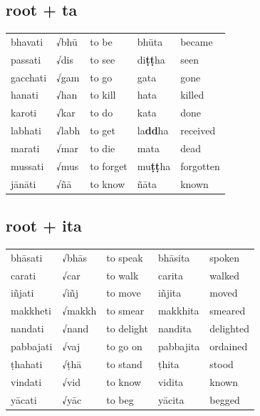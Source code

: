 \documentclass[11pt,oneside]{memoir}
\begin{document}
\subsection{root + ta}
\label{sec:org4da6b1a}

\begin{center}
\begin{tabular}{lllll}
bhavati & √bhū & to be & bhūta & became\\[0pt]
passati & √dis & to see & di\textbf{ṭṭ}ha & seen\\[0pt]
gacchati & √gam & to go & gata & gone\\[0pt]
hanati & √han & to kill & hata & killed\\[0pt]
karoti & √kar & to do & kata & done\\[0pt]
labhati & √labh & to get & la\textbf{dd}ha & received\\[0pt]
marati & √mar & to die & mata & dead\\[0pt]
mussati & √mus & to forget & mu\textbf{ṭṭ}ha & forgotten\\[0pt]
jānāti & √ñā & to know & ñāta & known\\[0pt]
\end{tabular}
\end{center}

\subsection{root + ita}
\label{sec:org2f9ae17}

\begin{center}
\begin{tabular}{lllll}
bhāsati & √bhās & to speak & bhāsita & spoken\\[0pt]
carati & √car & to walk & carita & walked\\[0pt]
iñjati & √iñj & to move & iñjita & moved\\[0pt]
makkheti & √makkh & to smear & makkhita & smeared\\[0pt]
nandati & √nand & to delight & nandita & delighted\\[0pt]
pabbajati & √vaj & to go on & pabbajita & ordained\\[0pt]
ṭhahati & √ṭhā & to stand & ṭhita & stood\\[0pt]
vindati & √vid & to know & vidita & known\\[0pt]
yācati & √yāc & to beg & yācita & begged\\[0pt]
\end{tabular}
\end{center}
\end{document}
